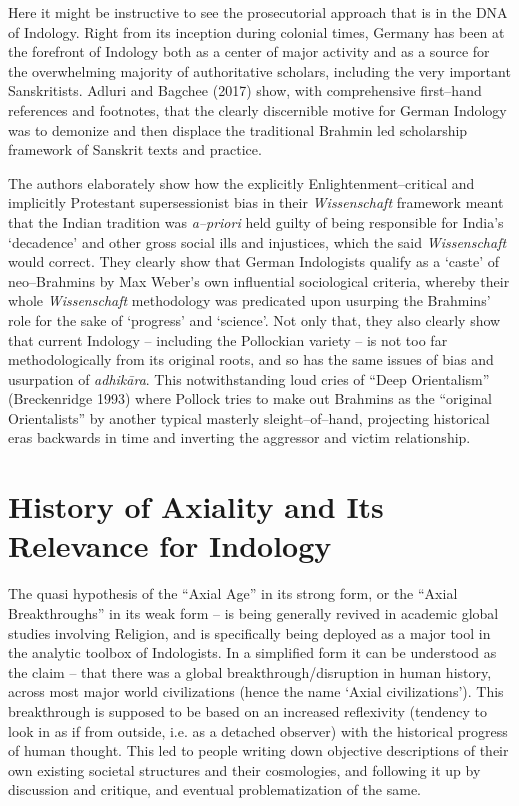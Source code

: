 Here it might be instructive to see the prosecutorial approach that is in the DNA of Indology. Right from its inception during colonial times, Germany has been at the forefront of Indology both as a center of major activity and as a source for the overwhelming majority of authoritative scholars, including the very important Sanskritists. Adluri and Bagchee (2017) show, with comprehensive first–hand references and footnotes, that the clearly discernible motive for German Indology was to demonize and then displace the traditional Brahmin led scholarship framework of Sanskrit texts and practice.

The authors elaborately show how the explicitly Enlightenment–critical and implicitly Protestant supersessionist bias in their \textit{Wissenschaft} framework meant that the Indian tradition was \textit{a–priori} held guilty of being responsible for India’s ‘decadence’ and other gross social ills and injustices, which the said \textit{Wissenschaft} would correct. They clearly show that German Indologists qualify as a ‘caste’ of neo–Brahmins by Max Weber’s own influential sociological criteria, whereby their whole \textit{Wissenschaft} methodology was predicated upon usurping the Brahmins’ role for the sake of ‘progress’ and ‘science’. Not only that, they also clearly show that current Indology – including the Pollockian variety – is not too far methodologically from its original roots, and so has the same issues of bias and usurpation of \textit{adhikāra}. This notwithstanding loud cries of “Deep Orientalism” (Breckenridge 1993) where Pollock tries to make out Brahmins as the “original Orientalists” by another typical masterly sleight–of–hand, projecting historical eras backwards in time and inverting the aggressor and victim relationship.


\section*{History of Axiality and Its Relevance for Indology}

The quasi hypothesis of the “Axial Age” in its strong form, or the “Axial Breakthroughs” in its weak form – is being generally revived in academic global studies involving Religion, and is specifically being deployed as a major tool in the analytic toolbox of Indologists. In a simplified form it can be understood as the claim – that there was a global breakthrough/disruption in human history, across most major world civilizations (hence the name ‘Axial civilizations’). This breakthrough is supposed to be based on an increased reflexivity (tendency to look in as if from outside, i.e. as a detached observer) with the historical progress of human thought. This led to people writing down objective descriptions of their own existing societal structures and their cosmologies, and following it up by discussion and critique, and eventual problematization of the same.

